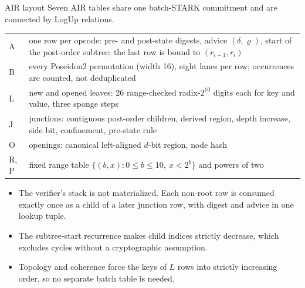 \documentclass[aspectratio=169,10pt]{beamer}
\begin{document}
\begin{frame}{AIR layout}
\small
Seven AIR tables share one batch-STARK commitment and are connected by LogUp relations.

\vspace{1mm}
\footnotesize
\begin{tabular}{@{}l >{\raggedright\arraybackslash}p{12.4cm}@{}}
\toprule
A & one row per opcode: pre- and post-state digests, advice $(\delta,\varrho)$, start of the post-order subtree; the last row is bound to $(r_{i-1}, r_i)$ \\
B & every Poseidon2 permutation (width 16), eight lanes per row; occurrences are counted, not deduplicated \\
L & new and opened leaves: 26 range-checked radix-$2^{10}$ digits each for key and value, three sponge steps \\
J & junctions: contiguous post-order children, derived region, depth increase, side bit, confinement, pre-state rule \\
O & openings: canonical left-aligned $d$-bit region, node hash \\
R, P & fixed range table $\{(b,x) : 0 \le b \le 10,\ x < 2^b\}$ and powers of two \\
\bottomrule
\end{tabular}

\vspace{2mm}
\small
\begin{itemize}
  \item The verifier's stack is not materialized. Each non-root row is consumed exactly once as a child of a later junction row, with digest and advice in one lookup tuple.
  \item The subtree-start recurrence makes child indices strictly decrease, which excludes cycles without a cryptographic assumption.
  \item Topology and coherence force the keys of $L$ rows into strictly increasing order, so no separate batch table is needed.
\end{itemize}
\end{frame}
\end{document}

